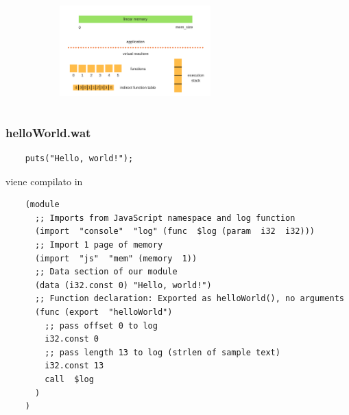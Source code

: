 \documentclass{beamer}
\newcommand\Fontvi{\fontsize{9.5}{7.2}\selectfont}
\begin{document}
\begin{frame}
\begin{columns}
\begin{column}{0.4\textwidth}
  \centerline{\includegraphics[width=10cm,height=3.5cm,keepaspectratio]{images/linmem.png}}
    \end{column}
  \end{columns}
\end{frame}

\begin{frame}[fragile]
  \frametitle{helloWorld.wat}
  \Fontvi
  \begin{verbatim}
    puts("Hello, world!");
  \end{verbatim}

  viene compilato in 

  \begin{verbatim}
    (module
      ;; Imports from JavaScript namespace and log function
      (import  "console"  "log" (func  $log (param  i32  i32)))
      ;; Import 1 page of memory
      (import  "js"  "mem" (memory  1))
      ;; Data section of our module
      (data (i32.const 0) "Hello, world!")
      ;; Function declaration: Exported as helloWorld(), no arguments
      (func (export  "helloWorld")
        ;; pass offset 0 to log
        i32.const 0
        ;; pass length 13 to log (strlen of sample text)
        i32.const 13          
        call  $log
      )
    ) 
  \end{verbatim}
\end{frame}
\end{document}
